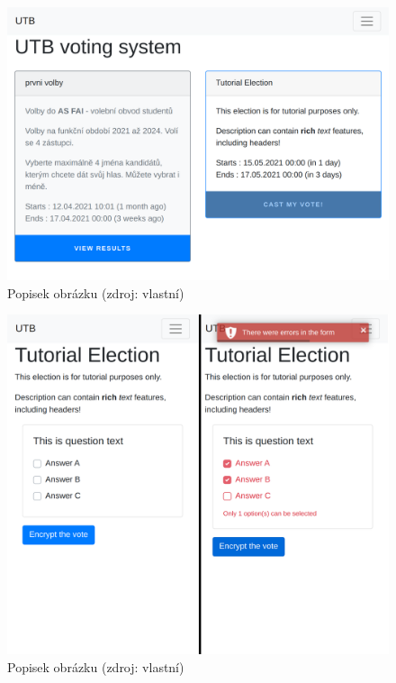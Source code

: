 \begin{figure}[h]
	\centering
	\includegraphics[width=\linewidth]{graphics/attachements/volbyPrehledDouble.png}
	\captionsetup{width=\linewidth}
	\caption*{Popisek obrázku (zdroj: vlastní)}
\end{figure}

\begin{figure}[h]
	\centering
	\includegraphics[width=\linewidth]{graphics/attachements/volbyCompared.png}
	\captionsetup{width=\linewidth}
	\caption*{Popisek obrázku (zdroj: vlastní)}
\end{figure}

